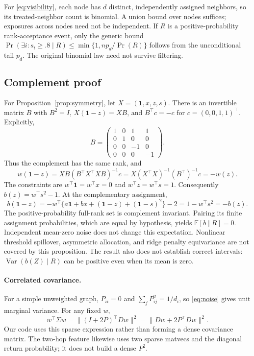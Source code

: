 \documentclass{article}
\newcommand{\E}{\mathbb E}
\newcommand{\Var}{\operatorname{Var}}
\newcommand{\one}{\mathbf 1}
\begin{document}
For \eqref{eq:visibility}, each node has $d$ distinct, independently assigned neighbors, so its treated-neighbor count is binomial. A union bound over nodes suffices; exposures across nodes need not be independent. If $R$ is a positive-probability rank-acceptance event, only the generic bound $\Pr(\exists i:s_i\geq .8\mid R)\leq\min\{1,np_d/\Pr(R)\}$ follows from the unconditional tail $p_d$. The original binomial law need not survive filtering.

\subsection{Complement proof}\label{app:symmetry}
For Proposition~\ref{prop:symmetry}, let $X=(\one,x,z,s)$. There is an invertible matrix $B$ with $B^2=I$, $X(\one-z)=XB$, and $B^\top c=-c$ for $c=(0,0,1,1)^\top$. Explicitly,
\[
B=\begin{pmatrix}1&0&1&1\\0&1&0&0\\0&0&-1&0\\0&0&0&-1\end{pmatrix}.
\]
Thus the complement has the same rank, and
\[
w(\one-z)=XB(B^\top X^\top XB)^{-1}c=X(X^\top X)^{-1}(B^\top)^{-1}c=-w(z).
\]
The constraints are $w^\top\one=w^\top x=0$ and $w^\top z=w^\top s=1$. Consequently $b(z)=w^\top s^2-1$. At the complementary assignment,
\[
b(\one-z)=-w^\top\{a\one+bx+(\one-z)+(\one-s)^2\}-2=1-w^\top s^2=-b(z).
\]
The positive-probability full-rank set is complement invariant. Pairing its finite assignment probabilities, which are equal by hypothesis, yields $\E[b\mid R]=0$. Independent mean-zero noise does not change this expectation. Nonlinear threshold spillover, asymmetric allocation, and ridge penalty equivariance are not covered by this proposition. The result also does not establish correct intervals: $\Var(b(Z)\mid R)$ can be positive even when its mean is zero.

\paragraph{Correlated covariance.}
For a simple unweighted graph, $P_{ii}=0$ and $\sum_jP_{ij}^2=1/d_i$, so \eqref{eq:noise} gives unit marginal variance. For any fixed $w$,
\[
w^\top\Sigma w=\|(I+2P)^\top Dw\|^2=\|Dw+2P^\top Dw\|^2.
\]
Our code uses this sparse expression rather than forming a dense covariance matrix. The two-hop feature likewise uses two sparse matvecs and the diagonal return probability; it does not build a dense $P^2$.
\end{document}
